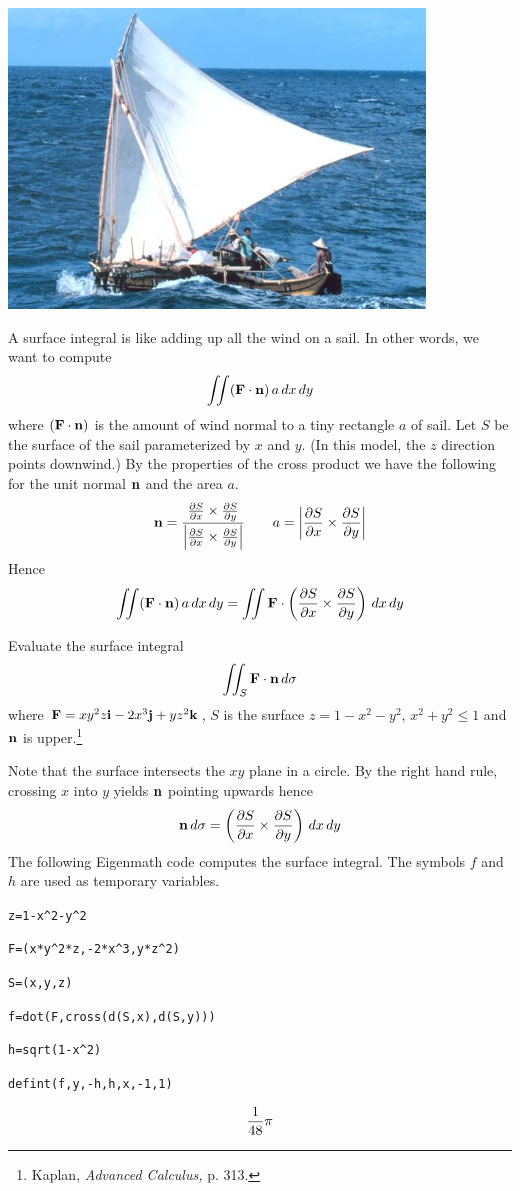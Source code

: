 
\newpage

\begin{center}
\noindent
\includegraphics[scale=0.5]{sailboat.png}
\end{center}

\bigskip
\noindent
A surface integral is like adding up all the wind on a sail.
In other words, we want to compute
$$\int\!\!\!\int({\bf F\cdot n})\,a\,dx\,dy$$
where $({\bf F\cdot n})$ is the amount of wind normal to a tiny rectangle $a$
of sail.
Let $S$ be the surface of the sail parameterized by $x$ and $y$.
(In this model, the $z$ direction points downwind.)
By the properties of the cross product we have the following for the unit normal $\bf n$
and the area $a$.
$${\bf n}={ {{\partial S\over\partial x}\times{\partial S\over\partial y}}\over
 {\left|{\partial S\over\partial x}\times{\partial S\over\partial y}\right|}}\qquad
a=\left|{\partial S\over\partial x}\times{\partial S\over\partial y}\right|$$
Hence
$$\int\!\!\!\int({\bf F\cdot n})\,a\,dx\,dy=\int\!\!\!\int{\bf F}\cdot
\left({{\partial S\over\partial x}\times{\partial S\over\partial y}}\right)\,dx\,dy$$

\newpage

\noindent
Evaluate the surface integral
$$\int\!\!\!\int_S{\bf F\cdot n}\,d\sigma$$
where ${\bf F}=xy^2z{\bf i}-2x^3{\bf j}+yz^2{\bf k}$, $S$ is the surface
$z=1-x^2-y^2$, $x^2+y^2\le1$ and $\bf n$ is upper.\footnote{
Kaplan, {\it Advanced Calculus,} p. 313.}

\medskip
\noindent
Note that the surface intersects the $xy$ plane in a circle.
By the right hand rule, crossing $x$ into $y$ yields $\bf n$ pointing upwards hence
$${\bf n}\,d\sigma=\left({{\partial S\over\partial x}\times{\partial S\over\partial y}}\right)\,dx\,dy$$
The following Eigenmath code computes the surface integral.
The symbols $f$ and $h$ are used as temporary variables.

\medskip
\verb$z=1-x^2-y^2$

\verb$F=(x*y^2*z,-2*x^3,y*z^2)$

\verb$S=(x,y,z)$

\verb$f=dot(F,cross(d(S,x),d(S,y)))$

\verb$h=sqrt(1-x^2)$

\verb$defint(f,y,-h,h,x,-1,1)$

$${1\over48}\pi$$

